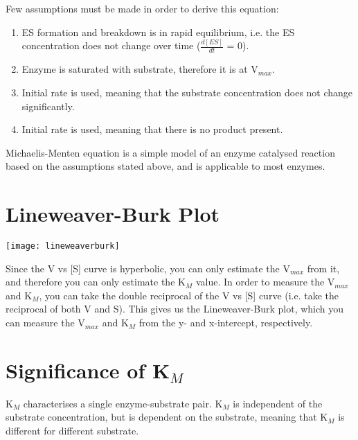 \documentclass[a4paper, 12pt]{report}
\begin{document}
Few assumptions must be made in order to derive this equation:
\begin{center}
\end{center}
\begin{enumerate}
\item ES formation and breakdown is in rapid equilibrium, i.e. the ES concentration does not change over time ({$\frac{d[ES]}{dt}$} = 0).
\item Enzyme is saturated with substrate, therefore it is at V$_{max}$.
\item Initial rate is used, meaning that the substrate concentration does not change significantly.
\item Initial rate is used, meaning that there is no product present.
\end{enumerate}

Michaelis-Menten equation is a simple model of an enzyme catalysed reaction based on the assumptions stated above, and is applicable to most enzymes.

\section{Lineweaver-Burk Plot}

\begin{center}
\texttt{[image: lineweaverburk]}
\end{center}

Since the V vs [S] curve is hyperbolic, you can only estimate the V$_{max}$ from it, and therefore you can only estimate the K$_M$ value.
In order to measure the V$_{max}$ and K$_M$, you can take the double reciprocal of the V vs [S] curve (i.e. take the reciprocal of both V and S).
This gives us the Lineweaver-Burk plot, which you can measure the V$_{max}$ and K$_M$ from the y- and x-intercept, respectively.

\section{Significance of K$_M$}

\begin{center}
\end{center}

K$_M$ characterises a single enzyme-substrate pair.
K$_M$ is independent of the substrate concentration, but is dependent on the substrate, meaning that K$_M$ is different for different substrate.
\end{document}

